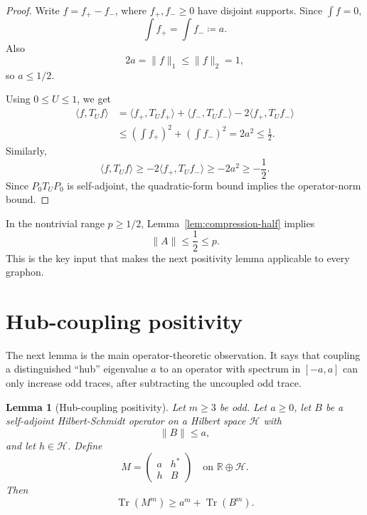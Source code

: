 \documentclass[11pt]{article}
\newtheorem{lemma}[theorem]{Lemma}
\theoremstyle{definition}
\theoremstyle{remark}
\newcommand{\ip}[2]{\langle #1,#2\rangle}
\newcommand{\Tr}{\operatorname{Tr}}
\newcommand{\defeq}{\coloneqq}
\newcommand{\R}{\mathbb R}
\newcommand{\calH}{\mathcal H}
\begin{document}
\begin{proof}
Write $f=f_+-f_-$, where $f_+,f_-\ge0$ have disjoint supports.  Since $\int f=0$,
\[
  \int f_+=\int f_-\defeq a.
\]
Also
\[
  2a=\|f\|_1\le \|f\|_2=1,
\]
so $a\le1/2$.

Using $0\le U\le1$, we get
\begin{align*}
\ip{f}{T_Uf}
&=\ip{f_+}{T_Uf_+}+\ip{f_-}{T_Uf_-}-2\ip{f_+}{T_Uf_-} \\
&\le \left(\int f_+\right)^2+\left(\int f_-\right)^2
=2a^2\le\frac12.
\end{align*}
Similarly,
\[
  \ip{f}{T_Uf}
  \ge -2\ip{f_+}{T_Uf_-}
  \ge -2a^2
  \ge -\frac12.
\]
Since $P_0T_UP_0$ is self-adjoint, the quadratic-form bound implies the operator-norm bound.
\end{proof}

In the nontrivial range $p\ge1/2$, Lemma~\ref{lem:compression-half} implies
\[
  \|A\|\le\frac12\le p.
\]
This is the key input that makes the next positivity lemma applicable to every graphon.

\section{Hub-coupling positivity}

The next lemma is the main operator-theoretic observation.  It says that coupling a distinguished ``hub'' eigenvalue $a$ to an operator with spectrum in $[-a,a]$ can only increase odd traces, after subtracting the uncoupled odd trace.

\begin{lemma}[Hub-coupling positivity]\label{lem:hub}
Let $m\ge3$ be odd.  Let $a\ge0$, let $B$ be a self-adjoint Hilbert-Schmidt operator on a Hilbert space $\calH$ with
\[
  \|B\|\le a,
\]
and let $h\in\calH$.  Define
\[
  M=
  \begin{pmatrix}
    a & h^*\\
    h & B
  \end{pmatrix}
  \quad\text{on }\R\oplus\calH.
\]
Then
\[
  \Tr(M^m)\ge a^m+\Tr(B^m).
\]
\end{lemma}
\end{document}
